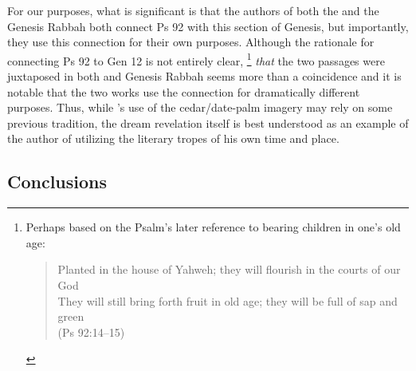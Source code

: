 For our purposes, what is significant is that the authors of both the \ga and the Genesis Rabbah both connect Ps 92 with this section of Genesis, but importantly, they use this connection for their own purposes. Although the rationale for connecting Ps 92 to Gen 12 is not entirely clear,%
%
\footnote{%
\begin{SingleSpace}Perhaps based on the Psalm's later reference to bearing children in one's old age:
\begin{quote}
    Planted in the house of Yahweh; they will flourish in the courts of our God\\
    They will still bring forth fruit in old age; they will be full of sap and green\\
    (Ps 92:14--15)
\end{quote}
\end{SingleSpace}}
%
\emph{that} the two passages were juxtaposed in both \ga and Genesis Rabbah seems more than a coincidence and it is notable that the two works use the connection for dramatically different purposes. Thus, while \ga's use of the cedar/date-palm imagery may rely on some previous tradition, the dream revelation itself is best understood as an example of the author of \ga utilizing the literary tropes of his own time and place. 



\subsection{Conclusions}

